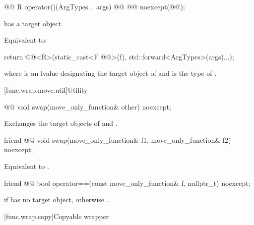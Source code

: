 %
\begin{itemdecl}
@@ R operator()(ArgTypes... args) @\cv{}@ @@ noexcept(@@);
\end{itemdecl}

\begin{itemdescr}
\pnum
\expects
{} has a target object.

\pnum
\effects
Equivalent to:
\begin{codeblock}
return @@<R>(static_cast<F @@>(f), std::forward<ArgTypes>(args)...);
\end{codeblock}
where  is an lvalue designating the target object of  and
 is the type of .
\end{itemdescr}

[func.wrap.move.util]{Utility}

%
\begin{itemdecl}
@@ void swap(move_only_function& other) noexcept;
\end{itemdecl}

\begin{itemdescr}
\pnum
\effects
Exchanges the target objects of  and .
\end{itemdescr}

%
\begin{itemdecl}
friend @@ void swap(move_only_function& f1, move_only_function& f2) noexcept;
\end{itemdecl}

\begin{itemdescr}
\pnum
\effects
Equivalent to .
\end{itemdescr}

%
\begin{itemdecl}
friend @@ bool operator==(const move_only_function& f, nullptr_t) noexcept;
\end{itemdecl}

\begin{itemdescr}
\pnum
\returns
{} if  has no target object, otherwise .
\end{itemdescr}

[func.wrap.copy]{Copyable wrapper}


